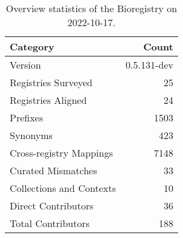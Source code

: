 \begin{table}
\centering
\caption{Overview statistics of the Bioregistry on 2022-10-17.}
\label{tab:bioregistry-summary}
\begin{tabular}{lr}
\toprule
                Category &       Count \\
\midrule
                 Version & 0.5.131-dev \\
     Registries Surveyed &          25 \\
      Registries Aligned &          24 \\
                Prefixes &        1503 \\
                Synonyms &         423 \\
 Cross-registry Mappings &        7148 \\
      Curated Mismatches &          33 \\
Collections and Contexts &          10 \\
     Direct Contributors &          36 \\
      Total Contributors &         188 \\
\bottomrule
\end{tabular}
\end{table}
